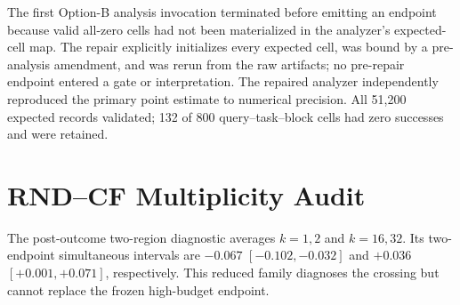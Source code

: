 \documentclass[11pt]{article}
\begin{document}
The first Option-B analysis invocation terminated before emitting an endpoint because valid all-zero cells had not been materialized in the analyzer's expected-cell map. The repair explicitly initializes every expected cell, was bound by a pre-analysis amendment, and was rerun from the raw artifacts; no pre-repair endpoint entered a gate or interpretation. The repaired analyzer independently reproduced the primary point estimate to numerical precision. All 51,200 expected records validated; 132 of 800 query--task--block cells had zero successes and were retained.

\section{RND--CF Multiplicity Audit}
\label{app:multiplicity}

\begin{table}[h]
\caption{RND minus CF per-$k$ contrasts from a post-outcome audit with 50,000 task-stratified paired-query bootstrap replicates. Raw intervals are unadjusted and can differ in the third decimal from the frozen analyzer's 10,000-replicate secondary intervals; simultaneous intervals use a seven-endpoint nonstudentized maximum-deviation family.}
\centering
\small
{}
\end{table}

The post-outcome two-region diagnostic averages $k=1,2$ and $k=16,32$. Its two-endpoint simultaneous intervals are $-0.067$ $[-0.102,-0.032]$ and $+0.036$ $[+0.001,+0.071]$, respectively. This reduced family diagnoses the crossing but cannot replace the frozen high-budget endpoint.
\end{document}
